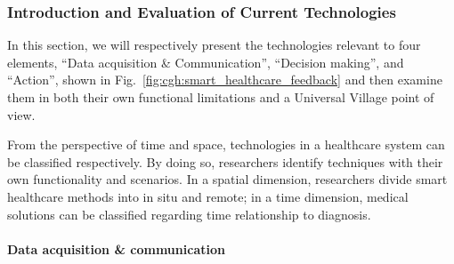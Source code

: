 \documentclass[letterpaper, twocolumn, 10pt, conference]{IEEEtran}
\begin{document}
\subsubsection{Introduction and Evaluation of Current Technologies}
\label{sssec:cgh:smart_health:evaluation}

In this section, we will respectively present the technologies relevant to four elements, \enquote{Data acquisition \& Communication}, \enquote{Decision making}, and  \enquote{Action},  shown in Fig.~\ref{fig:cgh:smart_healthcare_feedback} and then examine them in both their own functional limitations and a Universal Village point of view. 

From the perspective of time and space, technologies in a healthcare system can be classified respectively. By doing so, researchers identify techniques with their own functionality and scenarios. In a spatial dimension, researchers divide smart healthcare methods into in situ and remote; in a time dimension, medical solutions can be classified regarding time relationship to diagnosis.

\paragraph{Data acquisition \& communication}
\end{document}
